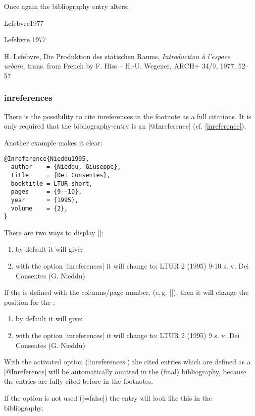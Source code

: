 \documentclass[a4paper,
10pt,
greek,
french,
spanish,
italian,
ngerman,
english
]{ltxdoc}
\begin{document}
Once again the bibliography entry alters:

\begin{bibbsp}{Lefebvre1977}%
\parbox[t]{2cm}{Lefebvre 1977} \parbox[t]{9cm}{H. Lefebvre, 
Die Produktion des stätischen Raums, \emph{Introduction à l’espace urbain}, 
{\color{red} trans. from French by F. Hiss -- H.-U. Wegener}, ARCH+ 34/9, 1977, 52–57}
\end{bibbsp}

\subsubsection{inreferences}\label{inreferences}
There is the possibility to cite inreferences in the footnote as a full citations.
It is only required that the bibliography-entry is an |@Inreference|  (cf. \cref{inreference}).
 
Another example makes it clear: 
\begin{lstlisting}[style=bibentry,label=Nieddu1995,caption={{@}Inreference\{Nieddu1995,…\} }]
@Inreference{Nieddu1995,
  author    = {Nieddu, Giuseppe},
  title     = {Dei Consentes},
  booktitle = LTUR-short,
  pages     = {9--10},
  year      = {1995},
  volume    = {2},
}
\end{lstlisting}
  \begin{refsection}
There are two ways to display  |\cite{Nieddu1995}|:
 \begin{enumerate}
 \item by default it will give:  %
 \cite{Nieddu1995}
 \item with the option |inreferences| it will change to:
 LTUR 2 (1995) 9-10 s. v. Dei Consentes (G. Nieddu)
  \end{enumerate}

If the  is defined with the columns/page number, (e.\,g. |\cite[9]{Nieddu1995}|), 
then it will change the position for the :
\begin{enumerate} 
 \item by default it will give:  %
 \cite[9]{Nieddu1995}
 \item with the option |inreferences| it will change to:
  LTUR 2 (1995) 9 s. v. Dei Consentes (G. Nieddu)
  \end{enumerate}
With the activated option   (|inreferences|) the cited entries which are defined as a |@Inreference| will be automatically omitted in the (final) bibliography,
because the entries are fully cited before in the footnotes.

If the option is not used (|=false|) the entry will look like this in the bibliography:
  \end{refsection}
\end{document}
